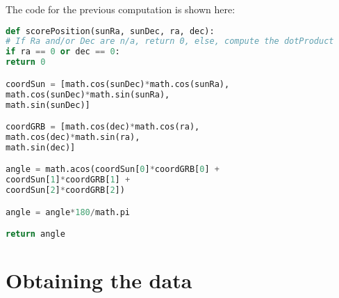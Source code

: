%
%
%

The code for the previous computation is shown here:\\

\begin{minipage}{\linewidth}
\begin{lstlisting}[language=Python, caption=Python function for computing the angle]
def scorePosition(sunRa, sunDec, ra, dec):
# If Ra and/or Dec are n/a, return 0, else, compute the dotProduct
if ra == 0 or dec == 0:
return 0

coordSun = [math.cos(sunDec)*math.cos(sunRa),
math.cos(sunDec)*math.sin(sunRa), 
math.sin(sunDec)]

coordGRB = [math.cos(dec)*math.cos(ra),
math.cos(dec)*math.sin(ra),
math.sin(dec)]

angle = math.acos(coordSun[0]*coordGRB[0] +
coordSun[1]*coordGRB[1] +
coordSun[2]*coordGRB[2])

angle = angle*180/math.pi

return angle\end{lstlisting}
\end{minipage}

\section{Obtaining the data}

